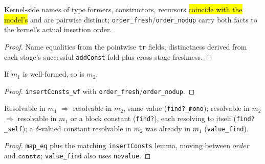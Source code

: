\begin{lemma}
\label{family:add-induct-names}
\leanok
{}

 Kernel-side names of type formers, constructors, recursors \hl{coincide
with the model's} and are pairwise distinct; \texttt{order\_fresh}/\texttt{order\_nodup}
carry both facts to the kernel's actual insertion order.
\end{lemma}
\begin{proof}
\leanok
{} Name equalities from the pointwise \texttt{tr} fields; distinctness derived
from each stage's successful \texttt{addConst} fold plus cross-stage freshness.
\end{proof}

\begin{lemma}
\label{thm:add-induct-wf}
\leanok
{}

 If $m_1$ is well-formed, so is $m_2$.
\end{lemma}
\begin{proof}
\leanok
{} \texttt{insertConsts\_wf} with \texttt{order\_fresh}/\texttt{order\_nodup}.
\end{proof}

\begin{lemma}
\label{family:add-induct-find}
\leanok
{}

 Resolvable in $m_1$ $\Rightarrow$ resolvable in $m_2$, same value
(\texttt{find?\_mono}); resolvable in $m_2$ $\Rightarrow$ resolvable in $m_1$ or a block
constant (\texttt{find?}), each resolving to itself (\texttt{find?\_self}); a
$\delta$-valued constant resolvable in $m_2$ was already in $m_1$ (\texttt{value\_find}).
\end{lemma}
\begin{proof}
\leanok
{} \texttt{map\_eq} plus the matching \texttt{insertConsts} lemma, moving between
$order$ and $\mathtt{consts}$; \texttt{value\_find} also uses \texttt{novalue}.
\end{proof}

